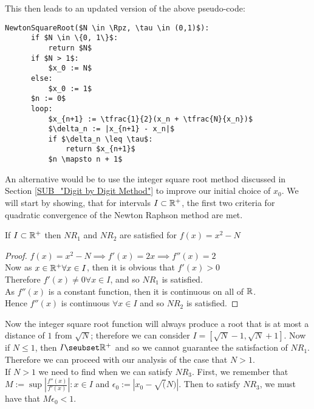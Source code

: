 This then leads to an updated version of the above pseudo-code:\\

\label{PCD_"Newton Square Root v1"}
\begin{lstlisting}[frame=single,mathescape,caption={Basic Newton Method for Square Root}]
  NewtonSquareRoot($N \in \Rpz, \tau \in (0,1)$):
      if $N \in \{0, 1\}$:
          return $N$
      if $N > 1$:
          $x_0 := N$
      else:
          $x_0 := 1$
      $n := 0$
      loop:
          $x_{n+1} := \tfrac{1}{2}(x_n + \tfrac{N}{x_n})$
          $\delta_n := |x_{n+1} - x_n|$
          if $\delta_n \leq \tau$:
              return $x_{n+1}$
          $n \mapsto n + 1$
\end{lstlisting}


An alternative would be to use the integer square root method discussed in Section \ref{SUB_"Digit by Digit Method"} to improve our initial choice of \(x_0\). We will start by showing, that for intervals \(I \subset \mathbb{R}^+\), the first two criteria for quadratic convergence of the Newton Raphson method are met.

\begin{SRNM NR1 and NR2}
\label{THM_"SRNM NR1 and NR2}
If \(I \subset \mathbb{R}^+\) then \(NR_1\) and \(NR_2\) are satisfied for \(f(x) = x^2 - N\)
\end{SRNM NR1 and NR2}

\begin{proof}
\(f(x) = x^2 - N \implies f'(x) = 2x \implies f''(x) = 2\)\\
Now as \(x \in \mathbb{R}^+ \forall x \in I\), then it is obvious that \(f'(x) > 0\)\\
Therefore \(f'(x) \neq 0 \forall x \in I\), and so \(NR_1\) is satisfied.\\
As \(f''(x)\) is a constant function, then it is continuous on all of \(\mathbb{R}\).\\
Hence \(f''(x)\) is continuous \(\forall x \in I\) and so \(NR_2\) is satisfied.
\end{proof}

Now the integer square root function will always produce a root that is at most a distance of \(1\) from \(\sqrt{N}\); therefore we can consider \(I = [\sqrt{N} - 1, \sqrt{N} + 1]\). Now if \(N \le 1\), then \(I \seubset \Rp\) and so we cannot guarantee the satisfaction of \(NR_1\). Therefore we can proceed with our analysis of the case that \(N > 1\).\\

If \(N > 1\) we need to find when we can satisfy \(NR_3\). First, we remember that \(M := \sup{\left|\tfrac{f''(x)}{f'(x)}\right| : x \in I}\) and \(\epsilon_0 := \left|x_0 - \sqrt(N)\right|\). Then to satisfy \(NR_3\), we must have that \(M\epsilon_0 < 1\).\\

